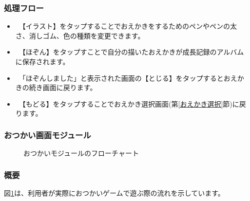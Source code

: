 \documentclass[a4j]{jarticle}
\begin{document}
\subsubsection*{処理フロー}
\begin{itemize}
\item　【イラスト】をタップすることでおえかきをするためのペンやペンの太さ、消しゴム、色の種類を変更できます。
\item　【ほぞん】をタップすことで自分の描いたおえかきが成長記録のアルバムに保存されます。
\item　「ほぞんしました」と表示された画面の【とじる】をタップするとおえかきの続き画面に戻ります。
\item　【もどる】をタップすることでおえかき選択画面(第\ref{おえかき選択}節)に戻ります。
\end{itemize}


\newpage

\subsubsection{おつかい画面モジュール\label{おつかい}}
\begin{figure}[H]
    \begin{center}
    \caption {おつかいモジュールのフローチャート}
    \label{otukai}
    \end{center}
\end{figure}

\subsubsection*{概要}
図\ref{otukai}は、利用者が実際におつかいゲームで遊ぶ際の流れを示しています。
\end{document}
